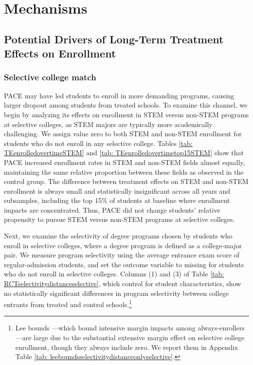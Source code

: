  
 \section{Mechanisms}
 \label{sec: mechanisms}

 
 \subsection{Potential Drivers of Long-Term Treatment Effects on Enrollment}\label{sec: mechanisms enrollment}




 
\subsubsection{Selective college match}\label{sec : college match}





PACE may have led students to enroll in more demanding programs, causing larger dropout among students from treated schools. To examine this channel, we begin by analyzing its effects on enrollment in STEM versus non-STEM programs at selective colleges, as STEM majors are typically more academically challenging. We assign value zero to both STEM and non-STEM enrollment for students who do not enroll in any selective college. Tables \ref{tab: TEenrolledovertimeSTEM} and \ref{tab: TEenrolledovertimetop15STEM} show that PACE increased enrollment rates in STEM and non-STEM fields almost equally, maintaining the same relative proportion between these fields as observed in the control group. The difference between treatment effects on STEM and non-STEM enrollment is always small and statistically insignificant across all years and subsamples, including the top 15\% of students at baseline where enrollment impacts are concentrated. Thus, PACE did not change students' relative propensity to pursue STEM versus non-STEM programs at selective colleges.\par 


Next, we examine the selectivity of degree programs chosen by students who enroll in selective colleges, where a degree program is defined as a college-major pair. We measure program selectivity using the average entrance exam score of regular-admission students, and set the outcome variable to missing for students who do not enroll in selective colleges. Columns (1) and (3) of Table \ref{tab: RCTselectivitydistanceselective}, which control for student characteristics, show no statistically significant differences in program selectivity between college entrants from treated and control schools.\footnote{ Lee bounds \citep{lee2009training}---which bound intensive margin impacts among always-enrollers---are large due to the substantial extensive margin effect on selective college enrollment, though they always include zero. We report them in Appendix Table \ref{tab: leeboundsselectivitydistanceonlyselective}.}\par 




